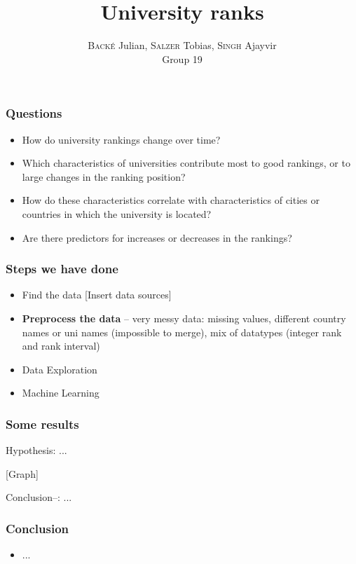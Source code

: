 \documentclass[mathserif,notheorems,11pt]{beamer}
\title{\textbf{University ranks}}
\author{\textsc{Back\'{e}} Julian, \textsc{Salzer} Tobias, \textsc{Singh} Ajayvir\\
Group 19}
\date{}
\begin{document}
\maketitle
\linespread{1.2}

\begin{frame} 
\frametitle{Questions}

\begin{itemize}
\item How do university rankings change over time? 

\item Which characteristics of universities contribute most to good rankings, or to large changes in the ranking position? 

\item How do these characteristics correlate with characteristics of cities or countries in which the university is
located? 

\item Are there predictors for increases or decreases in the rankings?
\end{itemize}
\end{frame}
\begin{frame} 
\frametitle{Steps we have done}

\begin{itemize}
\item Find the data
[Insert data sources]

\item \textbf{Preprocess the data} -- very messy data: missing values, different country names or uni names (impossible to merge), mix of datatypes (integer rank and rank interval)

\item Data Exploration 

\item Machine Learning
\end{itemize}
\end{frame}

\begin{frame} 
\frametitle{Some results}

Hypothesis: ...

[Graph]

Conclusion--: ...
\end{frame}

\begin{frame} 
\frametitle{Conclusion}
\begin{itemize}
\item ...

\end{itemize}


\end{frame}
\end{document}
